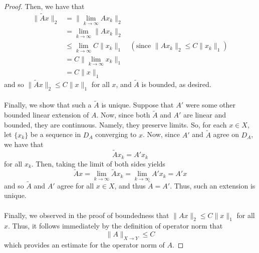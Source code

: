 \documentclass[fontsize=11pt]{scrartcl} %
\numberwithin{equation}{section} %
\numberwithin{figure}{section} %
\numberwithin{table}{section} %
\begin{document}
\begin{proof}
    Then, we have that
    \[
        \begin{aligned}
            \|\tilde{A}x\|_2 &= \|\lim_{k\to\infty}Ax_k\|_2\\
                    &=\lim_{k\to\infty}\|Ax_k\|_2\\
                    &\leq\lim_{k\to\infty}C\|x_k\|_1\  &(\textrm{since
                    }\|Ax_k\|_2\leq C\|x_k\|_1)\\
                    &=C\|\lim_{k\to\infty}x_k\|_1\\
                    &=C\|x\|_1
        \end{aligned}
    \]
    and so $\|\tilde{A}x\|_2\leq C\|x\|_1$ for all $x$, and $\tilde{A}$ is bounded,
    as desired.
    \\
    \\
    Finally, we show that such a $\tilde{A}$ is unique. Suppose that $A'$ were
    some other bounded linear extension of $A$. Now, since both $\tilde{A}$ and
    $A'$ are linear and bounded, they are continuous. Namely, they preserve
    limits. So, for each $x\in X$, let $\{x_k\}$ be a sequence in $D_A$
    converging to $x$. Now, since $A'$ and $\tilde{A}$ agree on $D_A$, we have
    that
    \[
        \tilde{A}x_k = A'x_k
    \]
    for all $x_k$. Then, taking the limit of both sides yields
    \[
        \tilde{A}x = \lim_{k\to\infty}\tilde{A}x_k = \lim_{k\to\infty}A'x_k =
        A'x
    \]
    and so $\tilde{A}$ and $A'$ agree for all $x\in X$, and thus $\tilde{A}=A'$.
    Thus, such an extension is unique.
    \\
    \\
    Finally, we observed in the proof of boundedness that $\|Ax\|_2\leq C\|x\|_1$
    for all $x$. Thus, it follows immediately by the definition of operator norm
    that
    \[
        \|A\|_{X\to Y} \leq C
    \]
    which provides an estimate for the operator norm of $A$.
\end{proof}
\end{document}
